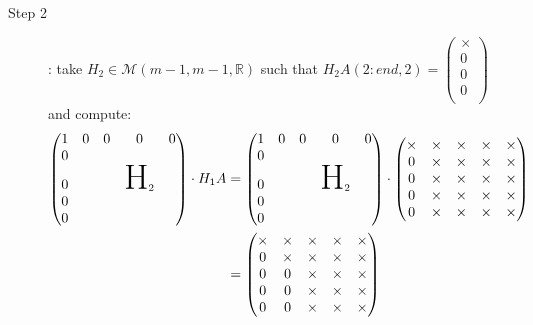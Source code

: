 \documentclass[computational_mathematics.tex]{subfiles}
\begin{document}
\begin{example}
\begin{description}
  \item[{\sc Step 2}]: take $H_{2} \in \mathcal{M}(m-1, m-1, \mathds{R})$ such that $H_{2}A(2:end, 2) = \begin{pmatrix} \times\\ 0\\ 0\\ 0\\ \end{pmatrix}$ and compute:
    \begin{equation}
      \begin{aligned}
        \begin{pmatrix}
          1 & 0 & 0 & 0 & 0\\
          0 & & & &\\
          0 & && \text{\Huge H}_2\\
          0 &&&\\
          0 &&&\\
        \end{pmatrix} \cdot H_1 A
        &= 
        \begin{pmatrix}
          1 & 0 & 0 & 0 & 0\\
          0 & & &\\
          0 && & \text{\Huge H}_2\\
          0 &&& \\
          0 &&&\\
        \end{pmatrix} \cdot  \begin{pmatrix}
          \times & \times & \times & \times & \times\\
          0 & \times & \times & \times & \times\\
          0 & \times & \times & \times & \times\\
          0 & \times & \times & \times & \times\\
          0 & \times & \times & \times & \times\\
        \end{pmatrix}\\
        &= \begin{pmatrix}
          \times & \times & \times & \times & \times\\
          0 & \times & \times & \times & \times\\
          0 & 0 & \times & \times & \times\\
          0 & 0 & \times & \times & \times\\
          0 & 0 & \times & \times & \times\\
        \end{pmatrix}
      \end{aligned}
    \end{equation}
    

\end{description}
\end{example}
\end{document}
